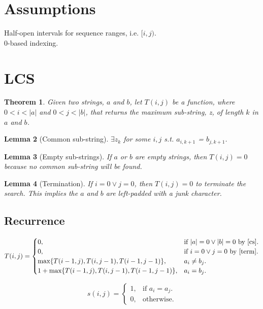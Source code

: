 \documentclass{article}
\newtheorem{theorem}{Theorem}[section]
\newtheorem{lemma}[theorem]{Lemma}
\begin{document}
	\section{Assumptions}
	Half-open intervals for sequence ranges, i.e. $[i,j)$.\\
	0-based indexing.
	
	\section{LCS}
	\begin{theorem}
	Given two strings, $a$ and $b$, let $T(i, j)$ be a function, where $0 < i < |a|$ and $0 < j < |b|$, that returns the 
	maximum sub-string, z, of length $k$ in $a$ and $b$.
	\end{theorem}
	
	\begin{lemma} [Common sub-string]
	\label{zk}	
	$\exists z_k$ for some $i, j$ s.t. $a_{i, k+1}$ = $b_{j, k+1}$.
	\end{lemma}
	
	\begin{lemma} [Empty sub-strings]
	\label{cs}	
	If $a$ or $b$ are empty strings, then $T(i,j)=0$ because no common sub-string will be found.
	\end{lemma}
	
	\begin{lemma} [Termination]
	\label{term}	
	If $i=0 \vee j=0$, then $T(i,j)=0$ to terminate the search. This implies the $a$ and $b$ are left-padded with a junk character.
	\end{lemma}
	
	\subsection{Recurrence}
	 \begin{equation}
	T(i, j)=			
	\begin{cases}
	0, & \text{if $|a|=0 \vee |b|=0$ by \ref{cs}}.\\
	0, & \text{if $i=0 \vee j=0$ by \ref{term}}.\\	
	\text{max}\{T(i-1,j), T(i,j-1), T(i-1,j-1)\}, & \text{$a_i \neq b_j$}.\\
	1+\text{max}\{T(i-1,j), T(i,j-1), T(i-1,j-1)\}, & \text{$a_i = b_j$}.			
	\end{cases}
	\end{equation}
	
	\begin{equation}
	s(i,j)=
	\begin{cases}
	1, & \text{if } a_i = a_j.\\
	0, & \text{otherwise.}
	\end{cases}
	\end{equation}
	
\end{document}
